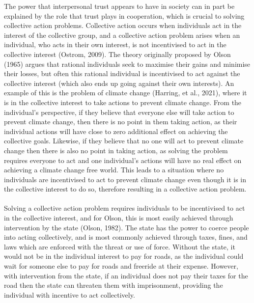 \documentclass[
  12pt,
]{article}
\begin{document}
The power that interpersonal trust appears to have in society can in part be explained by the role that trust plays in cooperation, which is crucial to solving collective action problems. Collective action occurs when individuals act in the interest of the collective group, and a collective action problem arises when an individual, who acts in their own interest, is not incentivised to act in the collective interest (Ostrom, 2009). The theory originally proposed by Olson (1965) argues that rational individuals seek to maximise their gains and minimise their losses, but often this rational individual is incentivised to act against the collective interest (which also ends up going against their own interests). An example of this is the problem of climate change (Harring, et al., 2021), where it is in the collective interest to take actions to prevent climate change. From the individual's perspective, if they believe that everyone else will take action to prevent climate change, then there is no point in them taking action, as their individual actions will have close to zero additional effect on achieving the collective goals. Likewise, if they believe that no one will act to prevent climate change then there is also no point in taking action, as solving the problem requires everyone to act and one individual's actions will have no real effect on achieving a climate change free world. This leads to a situation where no individuals are incentivised to act to prevent climate change even though it is in the collective interest to do so, therefore resulting in a collective action problem.\\
~\\
Solving a collective action problem requires individuals to be incentivised to act in the collective interest, and for Olson, this is most easily achieved through intervention by the state (Olson, 1982). The state has the power to coerce people into acting collectively, and is most commonly achieved through taxes, fines, and laws which are enforced with the threat or use of force. Without the state, it would not be in the individual interest to pay for roads, as the individual could wait for someone else to pay for roads and freeride at their expense. However, with intervention from the state, if an individual does not pay their taxes for the road then the state can threaten them with imprisonment, providing the individual with incentive to act collectively.\\
~\\
\end{document}
